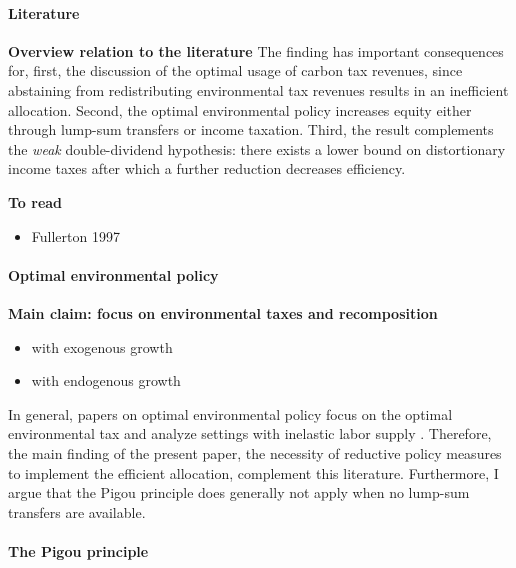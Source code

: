 \paragraph{Literature}
\textbf{Overview relation to the literature}
	The finding has important consequences for, first, the discussion of the optimal usage of carbon tax revenues, since abstaining from redistributing environmental tax revenues results in an inefficient allocation. Second, the optimal environmental policy increases equity either through lump-sum transfers or income taxation. Third, the result complements the \textit{weak} double-dividend hypothesis: there exists a lower bound on distortionary income taxes after which a further reduction decreases efficiency.

\textbf{To read}
\begin{itemize}
	\item Fullerton 1997
\end{itemize}
\paragraph{Optimal environmental policy}
\textbf{Main claim: focus on environmental taxes and recomposition}
\begin{itemize}
	\item with exogenous growth
	\item with endogenous growth
\end{itemize}

In general, papers on optimal environmental policy focus on the optimal environmental tax and analyze settings with inelastic labor supply \citep{Golosov2014OptimalEquilibrium, Acemoglu2012TheChang, Fried2018ClimateAnalysis}. Therefore, the main finding of the present paper, the necessity of reductive policy measures to implement the efficient allocation, complement this literature. Furthermore, I argue that the Pigou principle does generally not apply when no lump-sum transfers are available.  

\paragraph{The Pigou principle }


